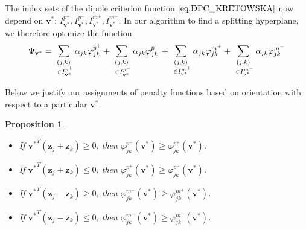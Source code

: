 \documentclass[sn-mathphys]{sn-jnl}%
\theoremstyle{thmstyleone}%
\newtheorem{proposition}[theorem]{Proposition}%
\theoremstyle{thmstyletwo}%
\theoremstyle{thmstylethree}%
\begin{document}
The index sets of the dipole criterion function $\eqref{eq:DPC_KRETOWSKA}$ now depend on $\mathbf{v}^\ast$: $I^{p^+}_{\mathbf{v}^\ast}, I^{p^-}_{\mathbf{v}^\ast}, I^{m^+}_{\mathbf{v}^\ast}, I^{m^-}_{\mathbf{v}^\ast}$. In our algorithm to find a splitting hyperplane, we therefore optimize the function
\begin{align}
	\Psi_{\mathbf{v}^\ast} = \sum_{\substack{(j, k) \\ \hspace{3.7pt} \in   I^{p^+}_{\mathbf{v}^\ast}}} \alpha_{jk} \varphi^{p^+}_{jk} + \sum_{\substack{(j, k) \\ \hspace{3.7pt} \in  I^{p^-}_{\mathbf{v}^\ast}}} \alpha_{jk} \varphi^{p^-}_{jk} +\sum_{\substack{(j, k) \\  \hspace{3.7pt} \in I^{m^+}_{\mathbf{v}^\ast}}} \alpha_{jk} \varphi^{m^+}_{jk} +\sum_{\substack{(j, k)   \\ \hspace{3.7pt} \in I^{m^-}_{\mathbf{v}^\ast}}} \alpha_{jk} \varphi^{m^-}_{jk} \label{eq:DPC}
\end{align}

Below we justify our assignments of penalty functions based on orientation with respect to a particular $\mathbf{v}^\ast$.

\begin{proposition} \hfill
\begin{itemize}
	\item[(a)] If ${\mathbf{v}^{\ast}}^T (\mathbf{z}_j + \mathbf{z}_k) \geq 0$, then $\varphi^{p^-}_{jk}(\mathbf{v}^{\ast}) \geq \varphi^{p^+}_{jk}(\mathbf{v}^{\ast})$.
	\item[(b)] If ${\mathbf{v}^{\ast}}^T (\mathbf{z}_j + \mathbf{z}_k) \leq 0$, then $\varphi^{p^+}_{jk}(\mathbf{v}^{\ast}) \geq \varphi^{p^-}_{jk}(\mathbf{v}^{\ast})$.
	\item[(c)] If ${\mathbf{v}^{\ast}}^T (\mathbf{z}_j - \mathbf{z}_k) \geq 0$, then $\varphi^{m^-}_{jk}(\mathbf{v}^{\ast}) \geq \varphi^{m^+}_{jk}(\mathbf{v}^{\ast})$.
	\item[(d)] If ${\mathbf{v}^{\ast}}^T (\mathbf{z}_j - \mathbf{z}_k) \leq 0$, then $\varphi^{m^+}_{jk}(\mathbf{v}^{\ast}) \geq \varphi^{m^-}_{jk}(\mathbf{v}^{\ast})$.
\end{itemize}
\end{proposition}
\end{document}
